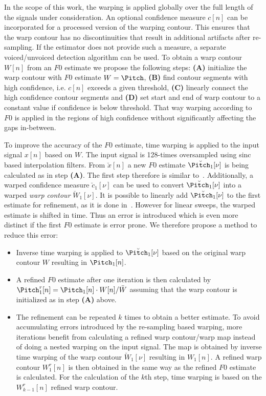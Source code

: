 In the scope of this work, the warping is applied globally over the full length of the signals under consideration. An optional confidence measure $c[n]$ can be incorporated for a processed version of the warping contour. This ensures that the warp contour has no discontinuities that result in additional artifacts after re-sampling. If the estimator does not provide such a measure, a separate voiced/unvoiced detection algorithm can be used. To obtain a warp contour $W[n]$ from an $F0$ estimate we propose the following steps: \textbf{(A)} initialize the warp contour with $F0$ estimate $W = \Pitch$, \textbf{(B)} find contour segments with high confidence, i.e. $c[n]$ exceeds a given threshold, \textbf{(C)} linearly connect the high confidence contour segments and \textbf{(D)} set start and end of warp contour to a constant value if confidence is below threshold. That way warping according to $F0$ is applied in the regions of high confidence without significantly affecting the gaps in-between.
\par
To improve the accuracy of the $F0$ estimate, time warping is applied to the input signal $x[n]$ based on $W$. The input signal is 128-times oversampled using sinc based interpolation filters.
From $\breve{x}[n]$ a new $F0$ estimate $\breve{\Pitch_1}[\nu]$ is being calculated as in step \textbf{(A)}. The first step therefore is similar to~\cite{resch}. Additionally, a warped confidence measure $\breve{c}_1[\nu]$ can be used to convert $\breve{\Pitch_1}[\nu]$ into a warped \emph{warp contour} $\breve{W}_1[\nu]$. It is possible to linearly add $\breve{\Pitch_1}[\nu]$ to the first estimate for refinement, as it is done in~\cite{azarov2012instantaneous}. However for linear sweeps, the warped estimate is shifted in time. Thus an error is introduced which is even more distinct if the first $F0$ estimate is error prone. We therefore propose a method to reduce this error:
\begin{itemize}
	\item Inverse time warping is applied to $\breve{\Pitch_1}[\nu]$ based on the original warp contour $W$ resulting in $\Pitch_1[n]$.
	\item A refined $F0$ estimate after one iteration is then calculated by $\Pitch_1^r[n] = \Pitch_1[n] \cdot W[n] / \bar{W}$ assuming that the warp contour is initialized as in step \textbf{(A)} above.
	\item The refinement can be repeated $k$ times to obtain a better estimate. To avoid accumulating errors introduced by the re-sampling based warping, more iterations benefit from calculating a refined warp contour/warp map instead of doing a nested warping on the input signal. The map is obtained by inverse time warping of the warp contour $\breve{W}_1[\nu]$ resulting in $W_1[n]$. A refined warp contour $W_1^r[n]$ is then obtained in the same way as the refined $F0$ estimate is calculated. For the calculation of the $k$th step, time warping is based on the $W_{k-1}^r[n]$ refined warp contour.
\end{itemize}
